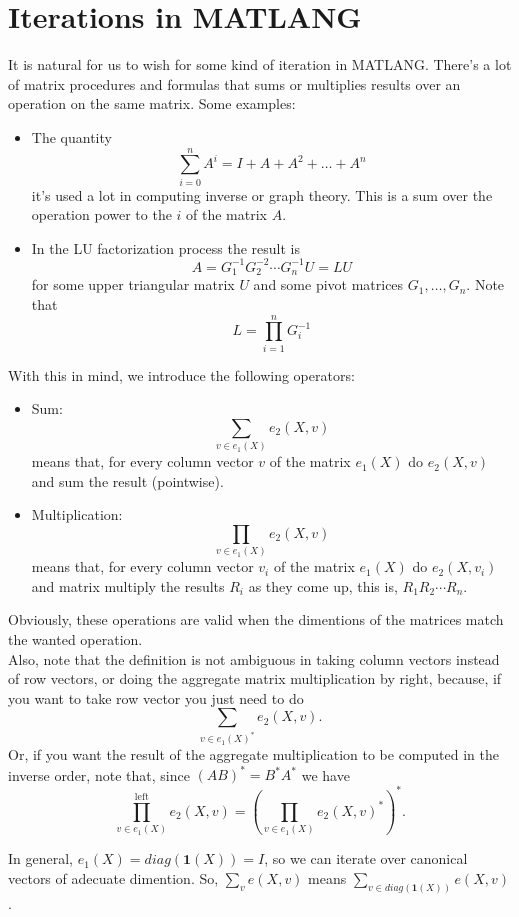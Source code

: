 \section{Iterations in MATLANG}
It is natural for us to wish for some kind of iteration in MATLANG. There's a lot of matrix procedures and formulas that sums or multiplies results over an operation on the same matrix. Some examples:
\begin{itemize}
	\item The quantity $$\sum_{i=0}^nA^i=I+A+A^2+\ldots + A^n$$ it's used a lot in computing inverse or graph theory. This is a sum over the operation power to the $i$ of the matrix $A$.
	\item In the LU factorization process the result is $$A=G_1^{-1}G_2^{-2}\cdots G_n^{-1}U=LU$$ for some upper triangular matrix $U$ and some pivot matrices $G_1, \ldots, G_n$. Note that $$L=\prod_{i=1}^nG_{i}^{-1}$$
\end{itemize}

With this in mind, we introduce the following operators:
\begin{itemize}
	\item Sum: $$\sum_{v\in e_1(X)}e_2(X,v)$$ means that, for every column vector $v$ of the matrix $e_1(X)$ do $e_2(X, v)$ and sum the result (pointwise).
	\item Multiplication: $$\prod_{v\in e_1(X)}e_2(X,v)$$ means that, for every column vector $v_i$ of the matrix $e_1(X)$ do $e_2(X,v_i)$ and matrix multiply the results $R_i$ as they come up, this is, $R_1R_2\cdots R_n$.
\end{itemize}

Obviously, these operations are valid when the dimentions of the matrices match the wanted operation. \\

Also, note that the definition is not ambiguous in taking column vectors instead of row vectors, or doing the aggregate matrix multiplication by right, because, if you want to take row vector you just need to do $$\sum_{v\in e_1(X)^*}e_2(X,v).$$ Or, if you want the result of the aggregate multiplication to be computed in the inverse order, note that, since $(AB)^*=B^*A^*$ we have $$\prod_{v\in e_1(X)}^{\text{left}}e_2(X,v)=\left(\prod_{v\in e_1(X)}e_2(X,v)^*\right)^*.$$


In general, $e_1(X)=diag(\mathbf{1}(X))=I$, so we can iterate over canonical vectors of adecuate dimention. So, $\sum_v e(X,v)$ means $\sum_{v\in diag(\mathbf{1}(X))}e(X,v)$. \\

